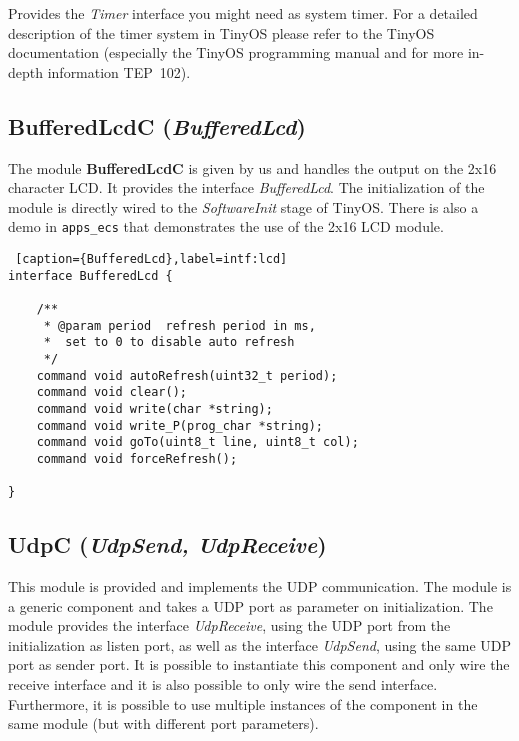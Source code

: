 \documentclass[a4paper,10pt]{article}
\newcommand{\module}[1]{\textbf{#1}}
\def\interface#1{{\em #1\/}}
\begin{document}
Provides the \emph{Timer} interface you might need as system timer.
For a detailed description of the timer system in TinyOS please refer to the
		TinyOS documentation (especially the TinyOS programming manual and for
		more in-depth information TEP~102).

\subsection{BufferedLcdC (\interface{BufferedLcd})}

The module \module{BufferedLcdC} is given by us and handles the output on the
	2x16 character LCD.
It provides the interface \interface{BufferedLcd}.
The initialization of the module is directly wired to the \emph{SoftwareInit}
	stage of TinyOS.
There is also a demo in \texttt{apps\_ecs} that demonstrates the use of the
	2x16 LCD module.

\begin{lstlisting} [caption={BufferedLcd},label=intf:lcd]
interface BufferedLcd {

	/**
	 * @param period  refresh period in ms,
	 * 	set to 0 to disable auto refresh
	 */
	command void autoRefresh(uint32_t period);
	command void clear();
	command void write(char *string);
	command void write_P(prog_char *string);
	command void goTo(uint8_t line, uint8_t col);
	command void forceRefresh();

}
\end{lstlisting}

\subsection{UdpC ({\interface{UdpSend, UdpReceive}})}

This module is provided and implements the UDP communication.
The module is a generic component and takes a UDP port as parameter on
	initialization.
The module provides the interface \interface{UdpReceive}, using the UDP port
	from the initialization as listen port, as well as the interface
	\interface{UdpSend}, using the same UDP port as sender port.
It is possible to instantiate this component and only wire the receive
	interface and it is also possible to only wire the send interface.
Furthermore, it is possible to use multiple instances of the component in the
	same module (but with different port parameters).
\end{document}
